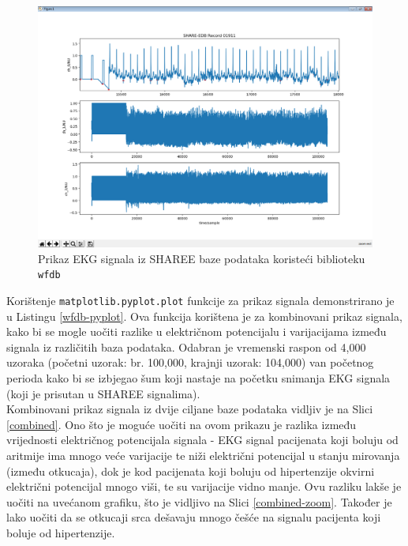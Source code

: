 \documentclass[12pt,a4paper]{article}
\begin{document}
\begin{figure}[H]
\center
\includegraphics[scale=0.45]{../res/plot-sharee.PNG}
\caption{Prikaz EKG signala iz SHAREE baze podataka koristeći biblioteku \texttt{wfdb}}
\label{plot-hypertension}
\end{figure}

Korištenje \texttt{matplotlib.pyplot.plot} funkcije za prikaz signala demonstrirano je u Listingu \ref{wfdb-pyplot}. Ova funkcija korištena je za kombinovani prikaz signala, kako bi se mogle uočiti razlike u električnom potencijalu i varijacijama između signala iz različitih baza podataka. Odabran je vremenski raspon od 4,000 uzoraka (početni uzorak: br. 100,000, krajnji uzorak: 104,000) van početnog perioda kako bi se izbjegao šum koji nastaje na početku snimanja EKG signala (koji je prisutan u SHAREE signalima). \\

Kombinovani prikaz signala iz dvije ciljane baze podataka vidljiv je na Slici \ref{combined}. Ono što je moguće uočiti na ovom prikazu je razlika između vrijednosti električnog potencijala signala - EKG signal pacijenata koji boluju od aritmije ima mnogo veće varijacije te niži električni potencijal u stanju mirovanja (između otkucaja), dok je kod pacijenata koji boluju od hipertenzije okvirni električni potencijal mnogo viši, te su varijacije vidno manje. Ovu razliku lakše je uočiti na uvećanom grafiku, što je vidljivo na Slici \ref{combined-zoom}. Također je lako uočiti da se otkucaji srca dešavaju mnogo češće na signalu pacijenta koji boluje od hipertenzije.
\end{document}

